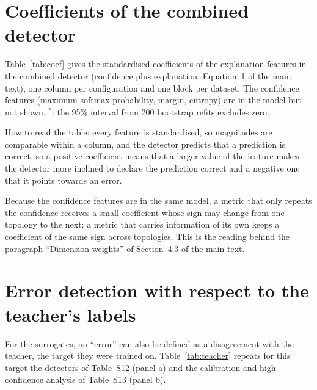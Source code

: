 \documentclass[3p,times,10pt,nopreprintline]{elsarticle}
\begin{document}
\clearpage
\section{Coefficients of the combined detector}

Table~\ref{tab:coef} gives the standardised coefficients of the explanation features in the combined detector (confidence plus explanation, Equation~1 of the main text), one column per configuration and one block per dataset. The confidence features (maximum softmax probability, margin, entropy) are in the model but not shown. \(^{*}\): the 95\% interval from 200 bootstrap refits excludes zero.

How to read the table: every feature is standardised, so magnitudes are comparable within a column, and the detector predicts that a prediction is correct, so a positive coefficient means that a larger value of the feature makes the detector more inclined to declare the prediction correct and a negative one that it points towards an error.

Because the confidence features are in the same model, a metric that only repeats the confidence receives a small coefficient whose sign may change from one topology to the next; a metric that carries information of its own keeps a coefficient of the same sign across topologies. This is the reading behind the paragraph ``Dimension weights'' of Section~4.3 of the main text.

\begin{landscape}
\begin{table}[H]
\centering
\scriptsize
\setlength{\tabcolsep}{4pt}
\caption{Standardised coefficients of the explanation features in the combined detector (gold-label errors), AG News (upper block) and SST-2 (lower block).}
\label{tab:coef}
\end{table}
\end{landscape}

\section{Error detection with respect to the teacher's labels}

For the surrogates, an ``error'' can also be defined as a disagreement with the teacher, the target they were trained on. Table~\ref{tab:teacher} repeats for this target the detectors of Table~S12 (panel a) and the calibration and high-confidence analysis of Table~S13 (panel b).
\end{document}
